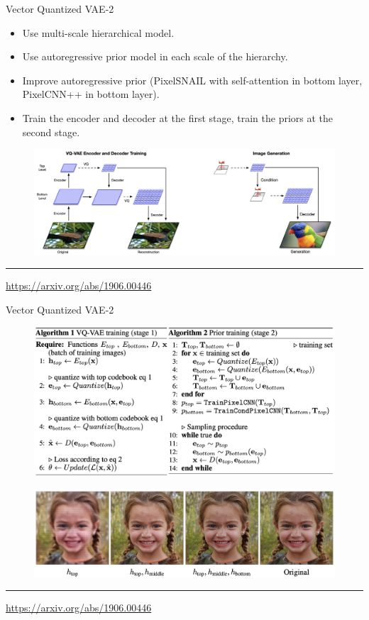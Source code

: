 \begin{frame}{Vector Quantized VAE-2}
	\begin{itemize}
		\item Use multi-scale hierarchical model.
		\item Use autoregressive prior model in each scale of the hierarchy.
		\item Improve autoregressive prior (PixelSNAIL with self-attention in bottom layer, PixelCNN++ in bottom layer).
		\item Train the encoder and decoder at the first stage, train the priors at the second stage.
	\end{itemize}
	\begin{figure}
		\centering
		\includegraphics[width=\linewidth]{figs/vqvae2}
	\end{figure}
	\vfill
	\hrule\medskip
	{\scriptsize \href{https://arxiv.org/abs/1906.00446}{https://arxiv.org/abs/1906.00446}} 
\end{frame}
\begin{frame}{Vector Quantized VAE-2}
		\begin{figure}
			\centering
			\includegraphics[width=0.9\linewidth]{figs/vqvae2_pseudo}
		\end{figure}
		\begin{figure}
			\centering
			\includegraphics[width=0.85\linewidth]{figs/vqvae2_latents}
		\end{figure}
	\vfill
	\hrule\medskip
	{\scriptsize \href{https://arxiv.org/abs/1906.00446}{https://arxiv.org/abs/1906.00446}} 
\end{frame}
